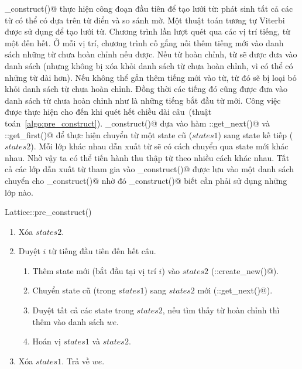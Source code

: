 \documentclass[a4paper,oneside,14pt]{extbook} %
\begin{document}
\verb@pre_construct()@ thực hiện công đoạn đầu tiên để tạo lưới từ:
phát sinh tất cả các từ có thể có dựa trên từ điển và so sánh mờ. Một
thuật toán tương tự Viterbi được sử dụng để tạo lưới từ. Chương trình
lần lượt quét qua các vị trí tiếng, từ một đến hết. Ở mỗi vị trí,
chương trình cố gắng nối thêm tiếng mới vào danh sách những từ chưa
hoàn chỉnh nếu được. Nếu từ hoàn chỉnh, từ sẽ được đưa vào danh sách
(nhưng không bị xóa khỏi danh sách từ chưa hoàn chỉnh, vì có thể có
những từ dài hơn). Nếu không thể gắn thêm tiếng mới vào từ, từ đó sẽ
bị loại bỏ khỏi danh sách từ chưa hoàn chỉnh. Đồng thời các tiếng đó
cũng được đưa vào danh sách từ chưa hoàn chỉnh như là những tiếng bắt
đầu từ mới. Công việc được thực hiện cho đến khi quét hết chiều dài
câu~(thuật toán~\ref{algo:pre_construct}). \verb@pre_construct()@ dựa
vào hàm \verb@WordState::get_next()@ và \verb@WordState::get_first()@
để thực hiện chuyển từ một state cũ ($states1$) sang state kế tiếp
($states2$). Mỗi lớp khác nhau dẫn xuất từ \verb@WordState@ sẽ có cách
chuyển qua state mới khác nhau. Nhờ vậy ta có thể tiến hành thu thập
từ theo nhiều cách khác nhau. Tất cả các lớp dẫn xuất từ
\verb@WordState@ tham gia vào \verb@pre_construct()@ được lưu vào một
danh sách \verb@WordStateFactories@ chuyển cho \verb@pre_construct()@
nhờ đó \verb@pre_construct()@ biết cần phải sử dụng những lớp nào.

\begin{algo}
  \caption{Lattice::pre\_construct()}
  \label{algo:pre_construct}
  \begin{enumerate}
  \item Xóa $states2$.
  \item Duyệt $i$ từ tiếng đầu tiên đến hết câu.
    \begin{enumerate}
    \item Thêm state mới (bắt đầu tại vị trí $i$) vào $states2$
      (\verb@WordStateFactory::create_new()@). 
    \item Chuyển state cũ (trong $states1$) sang $states2$ mới (\verb@WordState::get_next()@).
    \item Duyệt tất cả các state trong $states2$, nếu tìm thấy từ hoàn
      chỉnh thì thêm vào danh sách \verb@WordEntry@ $we$.
    \item Hoán vị $states1$ và $states2$.
    \end{enumerate}
  \item Xóa $states1$. Trả về $we$.
  \end{enumerate}
\end{algo}
\end{document}
